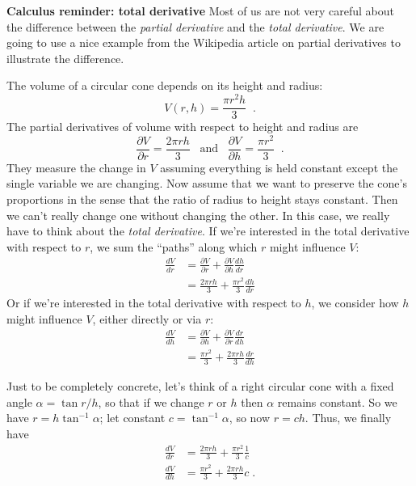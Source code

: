 \begin{examplebox} {\bf Calculus reminder: total derivative} Most of
  us are not very careful about the difference between the {\em
    partial derivative} and the {\em total derivative}.  We are going
  to use a nice example from the Wikipedia article on partial
  derivatives to illustrate the difference.

The volume of a circular cone depends on its height and radius:
\begin{equation}
V(r, h) = \frac{\pi r^2 h}{3}\;\;.
\end{equation}
The partial derivatives of volume with respect to height and radius
are
\begin{equation}
\frac{\partial V}{\partial r} = \frac{2\pi r
    h}{3}\;\;\;\text{and}\;\;\; 
\frac{\partial V}{\partial h} = \frac{\pi r^2}{3}\;\;.
\end{equation}
They measure the change in $V$ assuming everything is held constant
except the single variable we are changing.
Now assume that we want to preserve the cone's proportions in the sense that the ratio of radius to height stays constant. 
Then we can't really change one without changing the other.  
In this case, we really have to think about the {\em total derivative}. 
If we're interested in the total derivative with respect to $r$, we sum the ``paths'' along which $r$ might influence $V$:
\begin{align}
\frac{dV}{dr} & = \frac{\partial V}{\partial r} + \frac{\partial
  V}{\partial h} \frac{dh}{dr} \\
& = \frac{2 \pi r h}{3} + \frac{\pi r^2}{3} \frac{dh}{dr} 
\end{align}
Or if we're interested in the total derivative with respect to $h$, we consider how $h$ might influence $V$, either directly or via $r$:
\begin{align}
\frac{dV}{dh} & = \frac{\partial V}{\partial h} + \frac{\partial
  V}{\partial r} \frac{dr}{dh} \\
& = \frac{\pi r^2}{3} + \frac{2 \pi r h}{3} \frac{dr}{dh} 
\end{align}

Just to be completely concrete, let's think of a right circular cone
with a fixed angle $\alpha = \tan r / h$, so that if we change $r$ or
$h$ then $\alpha$ remains constant.  So we have $r = h \tan^{-1}
\alpha$;  let constant $c = \tan^{-1} \alpha$, so now $r = c h$.
Thus, we finally have
\begin{align}
\frac{dV}{dr} & = \frac{2 \pi r h}{3} + \frac{\pi r^2}{3} \frac{1}{c} \\
\frac{dV}{dh} & = \frac{\pi r^2}{3} + \frac{2 \pi r h}{3} c \; .
\end{align}

\end{examplebox}

